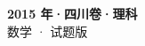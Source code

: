 \documentclass[zihao=-4, a4paper]{ctexart}
\begin{document}
\begin{center}
  {\Large\bfseries 2015 年·四川卷·理科}\\[4pt]
  {\large 数学 · 试题版}
\end{center}
\medskip
{}

\end{document}
